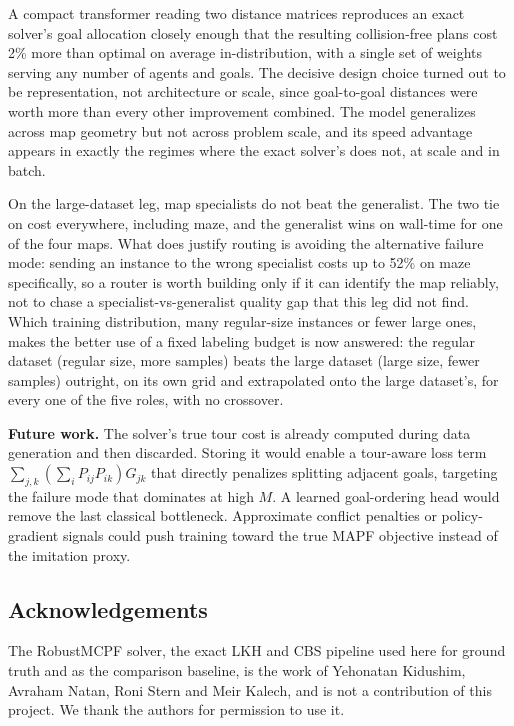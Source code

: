 \documentclass[11pt,a4paper]{article}
\begin{document}
A compact transformer reading two distance matrices reproduces an exact solver's goal allocation
closely enough that the resulting collision-free plans cost 2\% more than optimal on average
in-distribution, with a single set of weights serving any number of agents and goals. The decisive
design choice turned out to be representation, not architecture or scale, since goal-to-goal
distances were worth more than every other improvement combined. The model generalizes across map
geometry but not across problem scale, and its speed advantage appears in exactly the regimes where
the exact solver's does not, at scale and in batch.

On the large-dataset leg, map specialists do not beat the generalist. The two tie on
cost everywhere, including maze, and the generalist wins on wall-time for one of the four maps.
What does justify routing is avoiding the alternative failure mode: sending an instance to the
wrong specialist costs up to 52\% on maze specifically, so a router is worth building only if it
can identify the map reliably, not to chase a specialist-vs-generalist quality gap that this leg
did not find. Which training distribution, many regular-size instances or fewer large ones, makes
the better use of a fixed labeling budget is now answered: the regular dataset (regular size, more samples)
beats the large dataset (large size, fewer samples) outright, on its own grid and extrapolated onto
the large dataset's, for every one of the five roles, with no crossover.

\textbf{Future work.} The solver's true tour cost is already computed during data generation and then
discarded. Storing it would enable a tour-aware loss term
$\sum_{j,k}\left(\sum_i P_{ij}P_{ik}\right)G_{jk}$ that directly penalizes splitting adjacent goals,
targeting the failure mode that dominates at high $M$. A learned goal-ordering head would remove the
last classical bottleneck. Approximate conflict penalties or policy-gradient signals could push
training toward the true MAPF objective instead of the imitation proxy.

\subsection*{Acknowledgements}

The RobustMCPF solver, the exact LKH and CBS pipeline used here for ground truth and as the
comparison baseline, is the work of Yehonatan Kidushim, Avraham Natan, Roni Stern and Meir Kalech,
and is not a contribution of this project. We thank the authors for permission to use it.
\end{document}
